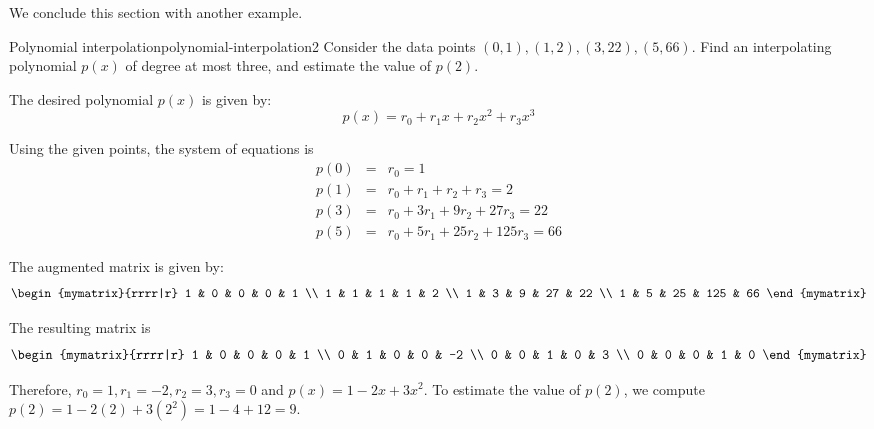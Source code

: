 We conclude this section with another example.

\begin{example}{Polynomial interpolation}{polynomial-interpolation2}
Consider the data points $(0,1), (1,2), (3,22), (5,66)$. Find an interpolating polynomial $p(x)$ of degree at most three, and estimate the value of $p(2)$.
\end{example}

\begin{solution}
The desired polynomial $p(x)$ is given by:
\[
p(x) = r_0 + r_1 x + r_2x^2 + r_3x^3
\]

Using the given points, the system of equations is
\begin{eqnarray*}
p(0) &=& r_0 = 1 \\
p(1) &=& r_0 + r_1 + r_2 + r_3 = 2 \\
p(3) &=& r_0 + 3r_1 + 9r_2 + 27r_3 = 22 \\
p(5) &=& r_0 + 5r_1 + 25r_2 + 125r_3 = 66
\end{eqnarray*}

The augmented matrix is given by:
\[
\begin{mymatrix}{rrrr|r}
1 & 0 & 0 & 0 & 1 \\
1 & 1 & 1 & 1 & 2 \\
1 & 3 & 9 & 27 & 22 \\
1 & 5 & 25 & 125 & 66
\end{mymatrix}
\]

The resulting matrix is
\[
\begin{mymatrix}{rrrr|r}
1 & 0 & 0 & 0 & 1 \\
0 & 1 & 0 & 0 & -2 \\
0 & 0 & 1 & 0 & 3 \\
0 & 0 & 0 & 1 & 0
\end{mymatrix}
\]

Therefore, $r_0 = 1, r_1 = -2, r_2 = 3, r_3 = 0$ and $p(x) = 1 -2x + 3x^2$. To estimate the value of $p(2)$, we compute $p(2) = 1 -2(2) + 3(2^2) = 1 - 4 + 12 = 9$.
\end{solution}